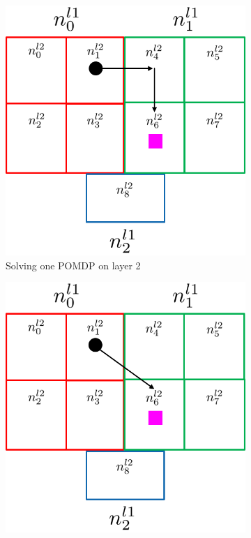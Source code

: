 \begin{figure}
    \centering
    \begin{subfigure}[b]{0.45\textwidth}
        \includegraphics[width=\textwidth]{Report/images/two_terminal_states_longroute.png}
        \caption[t]{Solving one POMDP on layer 2}
        \label{subfig:longroute}
    \end{subfigure}
    \hfill
    \begin{subfigure}[b]{0.45\textwidth}
        \includegraphics[width=\textwidth]{Report/images/two_terminal_states_shortroute.png}

\end{subfigure}
\end{figure}
